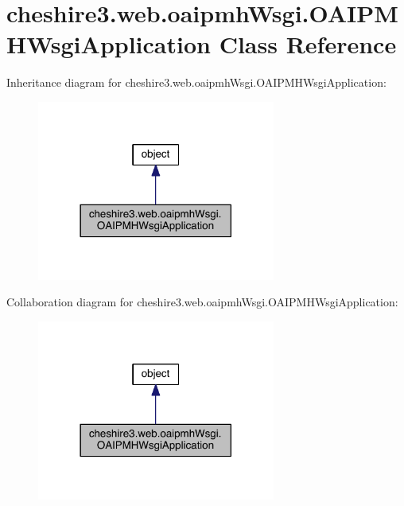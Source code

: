 \hypertarget{classcheshire3_1_1web_1_1oaipmh_wsgi_1_1_o_a_i_p_m_h_wsgi_application}{\section{cheshire3.\-web.\-oaipmh\-Wsgi.\-O\-A\-I\-P\-M\-H\-Wsgi\-Application Class Reference}
\label{classcheshire3_1_1web_1_1oaipmh_wsgi_1_1_o_a_i_p_m_h_wsgi_application}
}


Inheritance diagram for cheshire3.\-web.\-oaipmh\-Wsgi.\-O\-A\-I\-P\-M\-H\-Wsgi\-Application\-:
\nopagebreak
\begin{figure}[H]
\begin{center}
\leavevmode
\includegraphics[width=222pt]{classcheshire3_1_1web_1_1oaipmh_wsgi_1_1_o_a_i_p_m_h_wsgi_application__inherit__graph}
\end{center}
\end{figure}


Collaboration diagram for cheshire3.\-web.\-oaipmh\-Wsgi.\-O\-A\-I\-P\-M\-H\-Wsgi\-Application\-:
\nopagebreak
\begin{figure}[H]
\begin{center}
\leavevmode
\includegraphics[width=222pt]{classcheshire3_1_1web_1_1oaipmh_wsgi_1_1_o_a_i_p_m_h_wsgi_application__coll__graph}
\end{center}
\end{figure}
